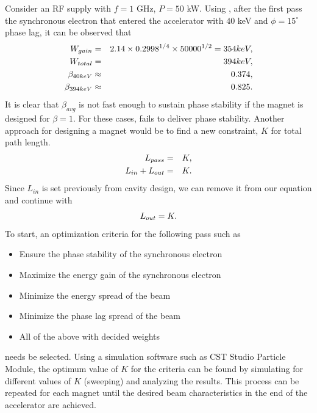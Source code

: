 \documentclass[a4paper,oneside,12pt]{report}
\numberwithin{equation}{chapter}
\begin{document}
Consider an RF supply with $f=1$ GHz, $P=50$ kW. Using , 
after the first pass the synchronous electron that entered the accelerator with $40$ keV and $\phi=15^\circ$ phase lag,
it can be observed that
\vspace{-10pt}\begin{eqnarray}
    W_{gain} &=& 2.14\times0.2998^{1/4}\times 50000^{1/2} = 354keV   ,\\
    W_{total} &=& 394 keV   ,\\
    \beta_{40keV} &\approx& 0.374   ,\\
    \beta_{394keV} &\approx& 0.825 .
\vspace{-20pt}\end{eqnarray}
It is clear that $\beta_{avg}$ is not fast enough to sustain phase stability if the magnet is designed for $\beta = 1$. 
For these cases,  fails to deliver phase stability.
Another approach for designing a magnet would be to find a new constraint, $K$ for total path length.
\vspace{-10pt}\begin{eqnarray}
    L_{pass} &=& K ,\\
    L_{in} + L_{out} &=& K .
\vspace{-20pt}\end{eqnarray}
Since $L_{in}$ is set previously from cavity design, we can remove it from our equation and continue with
\vspace{-10pt}\begin{equation} \label{eq:mag_sweep_constraint}
    L_{out} = K .
\vspace{-10pt}\end{equation}
\clearpage
To start, an optimization criteria for the following pass such as
\vspace{-10pt}
\begin{itemize}
    \item Ensure the phase stability of the synchronous electron
    \item Maximize the energy gain of the synchronous electron
    \item Minimize the energy spread of the beam
    \item Minimize the phase lag spread of the beam
    \item All of the above with decided weights
\vspace{-10pt}\end{itemize}
needs be selected. Using a simulation software such as CST Studio Particle Module, the optimum value of $K$ for the criteria can be found by simulating for different values of $K$ (sweeping) and analyzing the results.
This process can be repeated for each magnet until the desired beam characteristics in the end of the accelerator are achieved.
\end{document}

